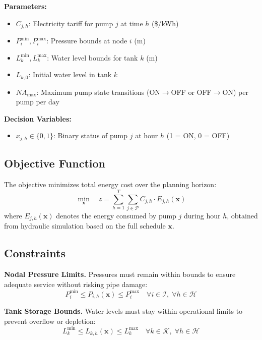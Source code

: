\documentclass[a4paper,fleqn]{cas-dc}
\begin{document}
\textbf{Parameters:}
\begin{itemize}
	\item $C_{j,h}$: Electricity tariff for pump $j$ at time $h$ (\$/kWh)
	\item $P_{i}^{\min}, P_{i}^{\max}$: Pressure bounds at node $i$ (m)
	\item $L_{k}^{\min}, L_{k}^{\max}$: Water level bounds for tank $k$ (m)
	\item $L_{k,0}$: Initial water level in tank $k$
	\item $NA_{\max}$: Maximum pump state transitions (ON$\to$OFF or OFF$\to$ON) per pump per day
\end{itemize}

\textbf{Decision Variables:}
\begin{itemize}
	\item $x_{j,h} \in \{0, 1\}$: Binary status of pump $j$ at hour $h$ (1 = ON, 0 = OFF)
\end{itemize}

\subsection{Objective Function}

The objective minimizes total energy cost over the planning horizon:
\begin{equation}
	\min_{\mathbf{x}} \quad z = \sum_{h=1}^{T} \sum_{j \in \mathcal{P}} C_{j,h} \cdot E_{j,h}(\mathbf{x})
\end{equation}
where $E_{j,h}(\mathbf{x})$ denotes the energy consumed by pump $j$ during hour $h$, obtained from hydraulic simulation based on the full schedule $\mathbf{x}$.

\subsection{Constraints}

\textbf{Nodal Pressure Limits.} Pressures must remain within bounds to ensure adequate service without risking pipe damage:
\begin{equation}
	P_{i}^{\min} \le P_{i,h}(\mathbf{x}) \le P_{i}^{\max} \quad \forall i \in \mathcal{I}, \; \forall h \in \mathcal{H}
	\label{eq:pressure_limits}
\end{equation}

\textbf{Tank Storage Bounds.} Water levels must stay within operational limits to prevent overflow or depletion:
\begin{equation}
	L_{k}^{\min} \le L_{k,h}(\mathbf{x}) \le L_{k}^{\max} \quad \forall k \in \mathcal{K}, \; \forall h \in \mathcal{H}
	\label{eq:tank_bounds}
\end{equation}
\end{document}
